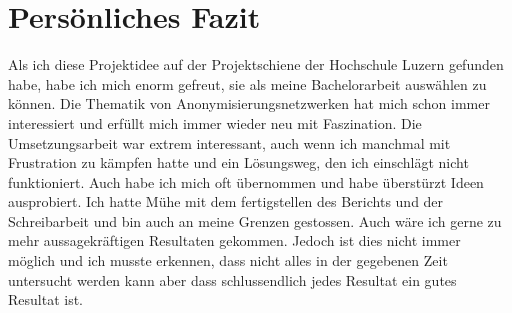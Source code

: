 \section{Persönliches Fazit}

Als ich diese Projektidee auf der Projektschiene der Hochschule Luzern gefunden habe, habe ich mich enorm gefreut, sie als meine Bachelorarbeit auswählen zu können.
Die Thematik von Anonymisierungsnetzwerken hat mich schon immer interessiert und erfüllt mich immer wieder neu mit Faszination.
Die Umsetzungsarbeit war extrem interessant, auch wenn ich manchmal mit Frustration zu kämpfen hatte und ein Lösungsweg, den ich einschlägt nicht funktioniert.
Auch habe ich mich oft übernommen und habe überstürzt Ideen ausprobiert.
Ich hatte Mühe mit dem fertigstellen des Berichts und der Schreibarbeit und bin auch an meine Grenzen gestossen.
Auch wäre ich gerne zu mehr aussagekräftigen Resultaten gekommen.
Jedoch ist dies nicht immer möglich und ich musste erkennen, dass nicht alles in der gegebenen Zeit untersucht werden kann aber dass schlussendlich jedes Resultat ein gutes Resultat ist.
